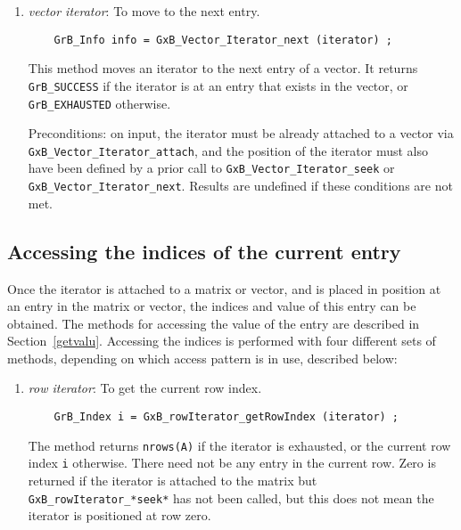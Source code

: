 \documentclass[12pt]{article}
\begin{document}
{\begin{enumerate}
    \item {\em vector iterator}: To move to the next entry.
    {\footnotesize
    \begin{verbatim}
    GrB_Info info = GxB_Vector_Iterator_next (iterator) ; \end{verbatim}}

    This method moves an iterator to the next entry of a vector.
    It returns \verb'GrB_SUCCESS' if the iterator is at an entry that
    exists in the vector, or \verb'GrB_EXHAUSTED' otherwise.

    Preconditions: on input, the iterator must be already attached to a
    vector via \verb'GxB_Vector_Iterator_attach', and the position of the
    iterator must also have been defined by a prior call to
    \verb'GxB_Vector_Iterator_seek' or \verb'GxB_Vector_Iterator_next'.
    Results are undefined if these conditions are not met.

    \end{enumerate}

\subsection{Accessing the indices of the current entry}

Once the iterator is attached to a matrix or vector, and is placed in position
at an entry in the matrix or vector, the indices and value of this entry can be
obtained.  The methods for accessing the value of the entry are described in
Section~\ref{getvalu}.  Accessing the indices is performed with four different
sets of methods, depending on which access pattern is in use, described below:

    \begin{enumerate}
    \item {\em row iterator}:  To get the current row index.
    {\footnotesize
    \begin{verbatim}
    GrB_Index i = GxB_rowIterator_getRowIndex (iterator) ; \end{verbatim}}

    The method returns \verb'nrows(A)' if the iterator is exhausted, or the
    current row index \verb'i' otherwise.  There need not be any entry in the
    current row.  Zero is returned if the iterator is attached to the matrix
    but \verb'GxB_rowIterator_*seek*' has not been called, but this does not
    mean the iterator is positioned at row zero.


\end{enumerate}}
\end{document}
